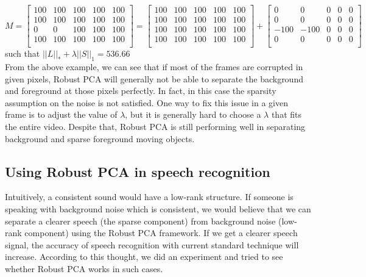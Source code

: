 \[
 M =
 \begin{bmatrix}
  100  & 100  & 100  & 100  & 100 \\
  100  & 100  & 100  & 100  & 100 \\
  0     &  0      & 100  & 100  & 100 \\
  100  & 100  & 100  & 100  & 100 \\
 \end{bmatrix}
 =
 \begin{bmatrix}
  100  & 100  & 100  & 100  & 100 \\
  100  & 100  & 100  & 100  & 100 \\
  100  & 100  & 100  & 100  & 100 \\
  100  & 100  & 100  & 100  & 100 \\
 \end{bmatrix}
 +
 \begin{bmatrix}
          0    &      0   &       0     &     0    &      0 \\
         0    &      0    &      0    &      0    &      0 \\
  -100  & -100   & 0   & 0   & 0 \\
         0    &      0   &       0     &     0     &     0 \\
 \end{bmatrix}
\]
such that $||L||_{*} + \lambda||S||_{1}  = 536.66$ \\

From the above example, we can see that if most of the frames are corrupted in given pixels, Robust PCA will generally not be able to separate the background and foreground at those pixels perfectly. In fact, in this case the sparsity assumption on the noise is not satisfied. One way to fix this issue in a given frame is to adjust the value of $\lambda$, but it is generally hard to choose a $\lambda$ that fits the entire video. Despite that, Robust PCA is still performing well in separating background and sparse foreground moving objects.


\subsection{Using Robust PCA in speech recognition}
Intuitively, a consistent sound would have a low-rank structure. If someone is speaking with background noise which is consistent, we would believe that we can separate a clearer speech (the sparse component) from background noise (low-rank component) using the Robust PCA framework. If we get a clearer speech signal, the accuracy of speech recognition with current standard technique will increase. According to this thought, we did an experiment and tried to see whether Robust PCA works in such cases.

